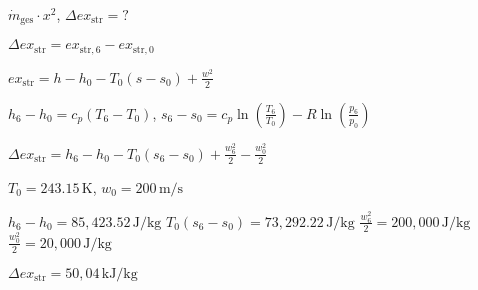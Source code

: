 \( \dot{m}_{\text{ges}} \cdot x^2 \), \( \Delta ex_{\text{str}} = ? \)  

\( \Delta ex_{\text{str}} = ex_{\text{str},6} - ex_{\text{str},0} \)  

\( ex_{\text{str}} = h - h_0 - T_0 (s - s_0) + \frac{w^2}{2} \)  

\( h_6 - h_0 = c_p (T_6 - T_0) \), \( s_6 - s_0 = c_p \ln \left( \frac{T_6}{T_0} \right) - R \ln \left( \frac{p_6}{p_0} \right) \)  

\( \Delta ex_{\text{str}} = h_6 - h_0 - T_0 (s_6 - s_0) + \frac{w_6^2}{2} - \frac{w_0^2}{2} \)  

\( T_0 = 243.15 \, \text{K} \), \( w_0 = 200 \, \text{m/s} \)  

\( h_6 - h_0 = 85,423.52 \, \text{J/kg} \)  
\( T_0 (s_6 - s_0) = 73,292.22 \, \text{J/kg} \)  
\( \frac{w_6^2}{2} = 200,000 \, \text{J/kg} \)  
\( \frac{w_0^2}{2} = 20,000 \, \text{J/kg} \)  

\( \Delta ex_{\text{str}} = 50,04 \, \text{kJ/kg} \)